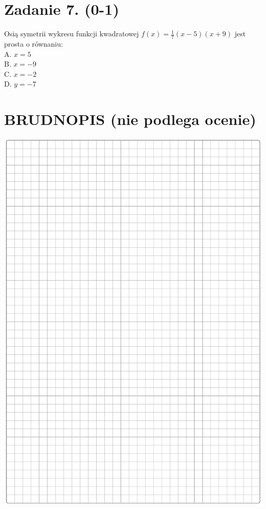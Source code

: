 \documentclass[10pt]{article}
\begin{document}
\section*{Zadanie 7. (0-1)}
Osią symetrii wykresu funkcji kwadratowej \(f(x)=\frac{1}{7}(x-5)(x+9)\) jest prosta o równaniu:\\
A. \(x=5\)\\
B. \(x=-9\)\\
C. \(x=-2\)\\
D. \(y=-7\)

\section*{BRUDNOPIS (nie podlega ocenie)}
\begin{center}
\includegraphics[max width=\textwidth]{2024_11_21_e15da647cf0a41077ac3g-03}
\end{center}
\end{document}
